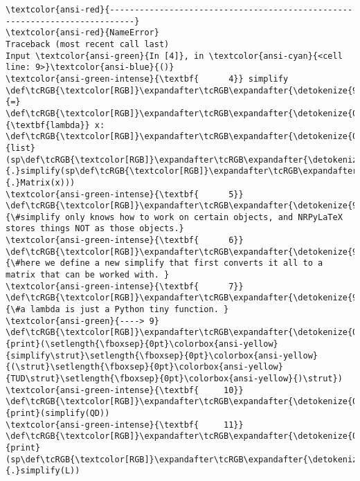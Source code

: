\documentclass[landscape,letterpaper,10pt,english]{article}
\begin{document}
    \begin{Verbatim}[commandchars=\\\{\}, frame=single, framerule=2mm, rulecolor=\color{outerrorbackground}]
\textcolor{ansi-red}{---------------------------------------------------------------------------}
\textcolor{ansi-red}{NameError}                                 Traceback (most recent call last)
Input \textcolor{ansi-green}{In [4]}, in \textcolor{ansi-cyan}{<cell line: 9>}\textcolor{ansi-blue}{()}
\textcolor{ansi-green-intense}{\textbf{      4}} simplify \def\tcRGB{\textcolor[RGB]}\expandafter\tcRGB\expandafter{\detokenize{98,98,98}}{=} \def\tcRGB{\textcolor[RGB]}\expandafter\tcRGB\expandafter{\detokenize{0,135,0}}{\textbf{lambda}} x: \def\tcRGB{\textcolor[RGB]}\expandafter\tcRGB\expandafter{\detokenize{0,135,0}}{list}(sp\def\tcRGB{\textcolor[RGB]}\expandafter\tcRGB\expandafter{\detokenize{98,98,98}}{.}simplify(sp\def\tcRGB{\textcolor[RGB]}\expandafter\tcRGB\expandafter{\detokenize{98,98,98}}{.}Matrix(x)))
\textcolor{ansi-green-intense}{\textbf{      5}} \def\tcRGB{\textcolor[RGB]}\expandafter\tcRGB\expandafter{\detokenize{95,135,135}}{\#simplify only knows how to work on certain objects, and NRPyLaTeX stores things NOT as those objects.}
\textcolor{ansi-green-intense}{\textbf{      6}} \def\tcRGB{\textcolor[RGB]}\expandafter\tcRGB\expandafter{\detokenize{95,135,135}}{\#here we define a new simplify that first converts it all to a matrix that can be worked with. }
\textcolor{ansi-green-intense}{\textbf{      7}} \def\tcRGB{\textcolor[RGB]}\expandafter\tcRGB\expandafter{\detokenize{95,135,135}}{\#a lambda is just a Python tiny function. }
\textcolor{ansi-green}{----> 9} \def\tcRGB{\textcolor[RGB]}\expandafter\tcRGB\expandafter{\detokenize{0,135,0}}{print}(\setlength{\fboxsep}{0pt}\colorbox{ansi-yellow}{simplify\strut}\setlength{\fboxsep}{0pt}\colorbox{ansi-yellow}{(\strut}\setlength{\fboxsep}{0pt}\colorbox{ansi-yellow}{TUD\strut}\setlength{\fboxsep}{0pt}\colorbox{ansi-yellow}{)\strut})
\textcolor{ansi-green-intense}{\textbf{     10}} \def\tcRGB{\textcolor[RGB]}\expandafter\tcRGB\expandafter{\detokenize{0,135,0}}{print}(simplify(QD))
\textcolor{ansi-green-intense}{\textbf{     11}} \def\tcRGB{\textcolor[RGB]}\expandafter\tcRGB\expandafter{\detokenize{0,135,0}}{print}(sp\def\tcRGB{\textcolor[RGB]}\expandafter\tcRGB\expandafter{\detokenize{98,98,98}}{.}simplify(L))


\end{Verbatim}
\end{document}
